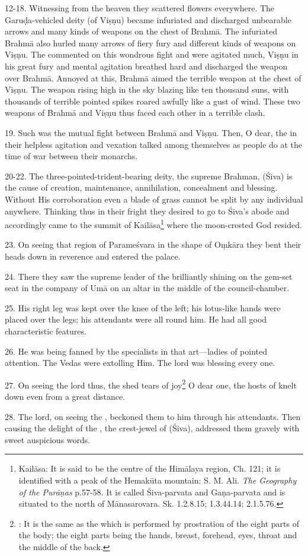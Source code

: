 12-18. Witnessing from the heaven they scattered flowers everywhere.
The Garuḍa-vehicled deity (of Viṣṇu) became infuriated and discharged unbearable
arrows and many kinds of weapons on the chest of Brahmā. The infuriated Brahmā
also hurled many arrows of fiery fury and different kinds of weapons on Viṣṇu.
The  commented on this wondrous fight and were agitated much, Viṣṇu
in his great fury and mental agitation breathed hard and discharged
the  weapon over Brahmā. Annoyed at this, Brahmā aimed
the terrible  weapon at the chest of Viṣṇu. The weapon rising high
in the sky blazing like ten thousand suns, with thousands of terrible pointed
spikes roared awfully like a gust of wind. These two weapons of Brahmā and Viṣṇu
thus faced each other in a terrible clash.

19. Such was the mutual fight between Brahmā and Viṣṇu. Then, O dear,
the  in their helpless agitation and vexation talked among themselves
as people do at the time of war between their monarchs.

20-22. The three-pointed-trident-bearing deity, the supreme Brahman, (\ie Śiva)
is the cause of creation, maintenance, annihilation, concealment and blessing.
Without His corroboration even a blade of grass cannot be split by any
individual anywhere. Thinking thus in their fright they desired to go to Śiva’s
abode and accordingly came to the summit of Kailāsa\footnote{Kailāsa: It is said
to be the centre of the Himālaya region,  Ch. 121; it is
identified with a peak of the Hemakūta mountain: S. M. Ali. \emph{The Geography
of the Purāṇas} p.57-58. It is called Śiva-parvata and Gaṇa-parvata and is
situated to the north of Mānasarovara. Sk. 1.2.8.15; 1.3.44.14; 2.1.5.76.} where
the moon-crested God resided.

23. On seeing that region of Parameśvara in the shape of Oṃkāra they bent their
heads down in reverence and entered the palace.

24. There they saw the supreme leader of the  brilliantly shining on
the gem-set seat in the company of Umā on an altar in the middle of
the council-chamber.

25. His right leg was kept over the knee of the left; his lotus-like hands were
placed over the legs; his attendants were all round him. He had all good
characteristic features.

26. He was being fanned by the specialists in that art—ladies of pointed
attention. The Vedas were extolling Him. The lord was blessing every one.

27. On seeing the lord thus, the  shed tears of joy\footnote{: It is the same as the  which is performed by
prostration of the eight parts of the body; the eight parts being the hands,
breast, forehead, eyes, throat and the middle of the back.} O dear one,
the hosts of  knelt down even from a great distance.

28. The lord, on seeing the , beckoned them to him through his
attendants. Then causing the delight of the , the crest-jewel of
 (\ie Śiva), addressed them gravely with sweet auspicious words.
